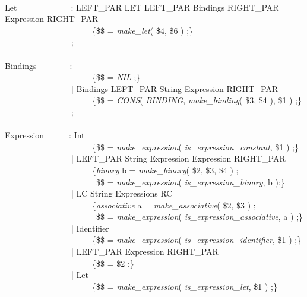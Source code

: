 \begin{pgm}
 \\
Let~~~~~~~~~~~~~: LEFT\_PAR LET LEFT\_PAR Bindings 
				RIGHT\_PAR Expression RIGHT\_PAR \\
~~~~~~~~~~~~~~~~~~~~~\{\$\$ = {\sl make\_let}( \$4, \$6 ) ;\} \\
~~~~~~~~~~~~~~~~; \\
 \\
Bindings~~~~~~~~: \\
~~~~~~~~~~~~~~~~~~~~~\{\$\$ = {\sl NIL} ;\} \\
~~~~~~~~~~~~~~~~| Bindings LEFT\_PAR String Expression RIGHT\_PAR  \\
~~~~~~~~~~~~~~~~~~~~~\{\$\$ = {\sl CONS}( {\sl BINDING}, 
				{\sl make\_binding}( \$3, \$4 ), \$1 ) ;\} \\
~~~~~~~~~~~~~~~~; \\
 \\
Expression~~~~~~: Int \\
~~~~~~~~~~~~~~~~~~~~~\{\$\$ = {\sl make\_expression}( 
				{\sl is\_expression\_constant}, \$1 ) ;\} \\
~~~~~~~~~~~~~~~~| LEFT\_PAR String Expression Expression RIGHT\_PAR  \\
~~~~~~~~~~~~~~~~~~~~~\{{\sl binary} b = 
				{\sl make\_binary}( \$2, \$3, \$4 ) ; \\
~~~~~~~~~~~~~~~~~~~~~~\$\$ = {\sl make\_expression}( 
				{\sl is\_expression\_binary}, b );\} \\
~~~~~~~~~~~~~~~~| LC String Expressions RC  \\
~~~~~~~~~~~~~~~~~~~~~\{{\sl associative} a = 
				{\sl make\_associative}( \$2, \$3 ) ; \\
~~~~~~~~~~~~~~~~~~~~~~\$\$ = {\sl make\_expression}( 
				{\sl is\_expression\_associative}, a ) ;\} \\
~~~~~~~~~~~~~~~~| Identifier  \\
~~~~~~~~~~~~~~~~~~~~~\{\$\$ = {\sl make\_expression}(
				{\sl is\_expression\_identifier}, \$1 ) ;\} \\
~~~~~~~~~~~~~~~~| LEFT\_PAR Expression RIGHT\_PAR  \\
~~~~~~~~~~~~~~~~~~~~~\{\$\$ = \$2 ;\} \\
~~~~~~~~~~~~~~~~| Let \\
~~~~~~~~~~~~~~~~~~~~~\{\$\$ = {\sl make\_expression}( 
				{\sl is\_expression\_let}, \$1 ) ;\} \\

\end{pgm}
